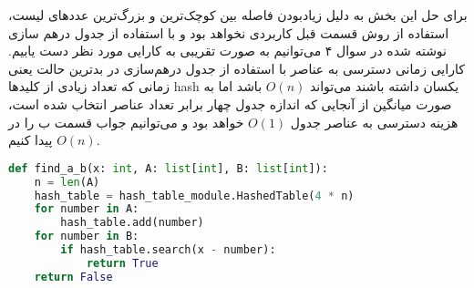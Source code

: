 \documentclass[]{article}
\begin{document}
برای حل این بخش به دلیل زیادبودن فاصله بین کوچک‌‌ترین و بزرگ‌ترین عددهای لیست،
استفاده از روش قسمت قبل کاربردی نخواهد بود و با استفاده از جدول درهم سازی نوشته شده در سوال ۴
می‌توانیم به صورت تقریبی به کارایی مورد نظر دست یابیم.
کارایی زمانی دسترسی به عناصر با استفاده از جدول درهم‌سازی در بدترین حالت یعنی زمانی که تعداد زیادی از کلید‌ها hash یکسان
داشته باشند می‌تواند $O(n)$ باشد اما به صورت میانگین از آنجایی که اندازه جدول چهار برابر تعداد عناصر انتخاب شده است، 
هزینه دسترسی به عناصر جدول $O(1)$ خواهد بود و می‌توانیم جواب قسمت ب را در $O(n)$ پیدا کنیم. 
\begin{latin}
\begin{lstlisting}[language=python]
def find_a_b(x: int, A: list[int], B: list[int]):
    n = len(A)
    hash_table = hash_table_module.HashedTable(4 * n)
    for number in A:
        hash_table.add(number)
    for number in B:
        if hash_table.search(x - number):
            return True
    return False
\end{lstlisting}
\end{latin}
\end{document}
